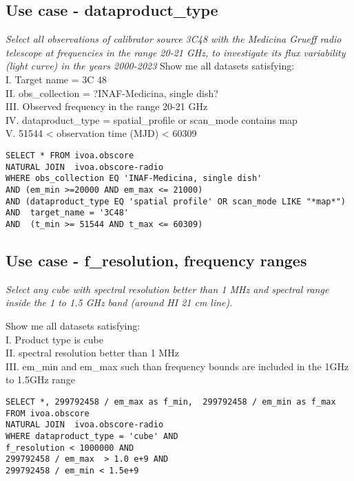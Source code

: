 \subsection{Use case - dataproduct\_type}
\textit{Select all observations of calibrator source 3C48 with the Medicina Grueff radio telescope at frequencies in the range 20-21 GHz, to investigate its flux variability (light curve) in the years 2000-2023}
Show me all datasets satisfying: \\
I. Target name = 3C 48 \\
II. obs\_collection = ?INAF-Medicina, single dish?\\
III. Observed frequency in the range 20-21 GHz \\
IV. dataproduct\_type = spatial\_profile or scan\_mode contains map\\
V. 51544 < observation time (MJD) < 60309 \\

\begin{verbatim}
SELECT * FROM ivoa.obscore
NATURAL JOIN  ivoa.obscore-radio
WHERE obs_collection EQ 'INAF-Medicina, single dish' 
AND (em_min >=20000 AND em_max <= 21000) 
AND (dataproduct_type EQ 'spatial profile' OR scan_mode LIKE "*map*") 
AND  target_name = '3C48' 
AND  (t_min >= 51544 AND t_max <= 60309)
\end{verbatim}

\subsection{Use case - f\_resolution, frequency ranges}
\label{sec:FreqRanges}

\textit{Select any cube with spectral resolution better than 1 MHz and spectral range inside the 1 to 1.5 GHz band (around HI 21 cm line).}

Show me all datasets satisfying:\\
I. Product type is cube \\
II. spectral resolution better than 1 MHz \\
III. em\_min and em\_max such than frequency bounds are included in the 1GHz to 1.5GHz range \\
\begin{verbatim}
SELECT *, 299792458 / em_max as f_min,  299792458 / em_min as f_max 
FROM ivoa.obscore 
NATURAL JOIN  ivoa.obscore-radio
WHERE dataproduct_type = 'cube' AND
f_resolution < 1000000 AND
299792458 / em_max  > 1.0 e+9 AND
299792458 / em_min < 1.5e+9
\end{verbatim}

